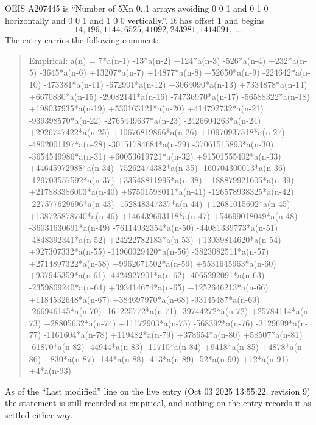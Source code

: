 \documentclass[11pt,a4paper]{article}
\theoremstyle{plain}
\theoremstyle{definition}
\begin{document}
OEIS A207445 is ``Number of 5Xn 0..1 arrays avoiding 0 0 1 and 0 1 0 horizontally and 0 0 1 and 1 0 0 vertically.''. It has offset
$1$ and begins
\[
14, 196, 1144, 6525, 41092, 243981, 1414091,\ \dots
\]
The entry carries the following comment:
\begin{quote}\small
Empirical: a(n) = 7*a(n-1) -13*a(n-2) +124*a(n-3) -526*a(n-4) +232*a(n-5) -3645*a(n-6) +13207*a(n-7) +14877*a(n-8) +52650*a(n-9) -224642*a(n-10) -473381*a(n-11) -672901*a(n-12) +3064090*a(n-13) +7334878*a(n-14) +6670830*a(n-15) -29082141*a(n-16) -74736970*a(n-17) -56588322*a(n-18) +198037935*a(n-19) +530163121*a(n-20) +414792732*a(n-21) -939398570*a(n-22) -2765449637*a(n-23) -2426604263*a(n-24) +2926747422*a(n-25) +10676819866*a(n-26) +10970937518*a(n-27) -4802001197*a(n-28) -30151784684*a(n-29) -37061515893*a(n-30) -3654549986*a(n-31) +60053619721*a(n-32) +91501555402*a(n-33) +44645972988*a(n-34) -75262474382*a(n-35) -160704300013*a(n-36) -129703557592*a(n-37) +33548811995*a(n-38) +188879921605*a(n-39) +217883386003*a(n-40) +67501598011*a(n-41) -126578938325*a(n-42) -227577629696*a(n-43) -152848347337*a(n-44) +12681015602*a(n-45) +138725878740*a(n-46) +146439693118*a(n-47) +54699018049*a(n-48) -36031630691*a(n-49) -76114932354*a(n-50) -44081339773*a(n-51) -4848392341*a(n-52) +24222782183*a(n-53) +13039814620*a(n-54) +927307332*a(n-55) -11960029420*a(n-56) -3823082511*a(n-57) +2714897322*a(n-58) +9962671502*a(n-59) +5531645963*a(n-60) +937945359*a(n-61) -4424927901*a(n-62) -4065292091*a(n-63) -2359809240*a(n-64) +393414674*a(n-65) +1252646213*a(n-66) +1184532648*a(n-67) +384697970*a(n-68) -93145487*a(n-69) -266946145*a(n-70) -161225772*a(n-71) -39744272*a(n-72) +25784114*a(n-73) +28805632*a(n-74) +11172903*a(n-75) -568392*a(n-76) -3129699*a(n-77) -1161604*a(n-78) +119482*a(n-79) +378654*a(n-80) +58507*a(n-81) -61870*a(n-82) -44944*a(n-83) -11710*a(n-84) +9418*a(n-85) +4878*a(n-86) +830*a(n-87) -144*a(n-88) -413*a(n-89) -52*a(n-90) +12*a(n-91) +4*a(n-93)
\end{quote}
As of the ``Last modified'' line on the live entry (Oct 03 2025 13:55:22, revision
9) the statement is still recorded as empirical, and nothing on the entry
records it as settled either way.
\end{document}
